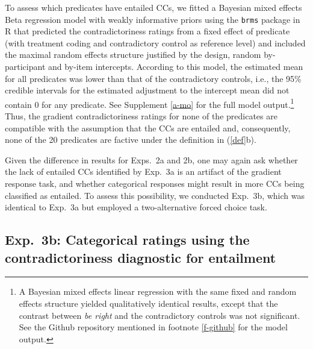 \documentclass[11pt,fleqn]{article}
\newcommand{\6}{\mbox{$[\hspace*{-.6mm}[$}}
\newcommand{\9}{\mbox{$]\hspace*{-.6mm}]$}}
\begin{document}
{To assess which predicates have entailed CCs, we fitted a Bayesian mixed effects Beta regression model  with weakly informative priors using the \verb|brms|  package in R that predicted the contradictoriness ratings from a fixed effect of predicate (with treatment coding and contradictory control as  reference level) and included the maximal random effects structure justified by the design, random by-participant and by-item intercepts. According to this model, the estimated mean for all predicates was lower than that of the contradictory controls, i.e., the 95\% credible intervals for the estimated adjustment to the intercept mean did not contain 0 for any predicate. See Supplement \ref{a-mo} for the full model output.\footnote{A Bayesian mixed effects linear regression with the same fixed and random effects structure yielded qualitatively identical results, except that the contrast between \emph{be right} and the contradictory controls was not significant. See the Github repository mentioned in footnote \ref{f-github} for the model output.} Thus, the gradient contradictoriness ratings for none of the predicates are compatible with the assumption that the CCs are entailed and, consequently, none of the 20 predicates are factive under the definition in (\ref{def}b). 

Given the difference in results for Exps.~2a and 2b, one may again ask whether the lack of entailed CCs identified by Exp.~3a is an artifact of the gradient response task, and whether categorical responses might result in more CCs being classified as entailed. To assess this possibility, we conducted Exp.~3b, which was identical to Exp.~3a but employed a two-alternative forced choice task.



\subsection{Exp.~3b: Categorical ratings using the contradictoriness diagnostic for entailment}\label{s32}

}
\end{document}
